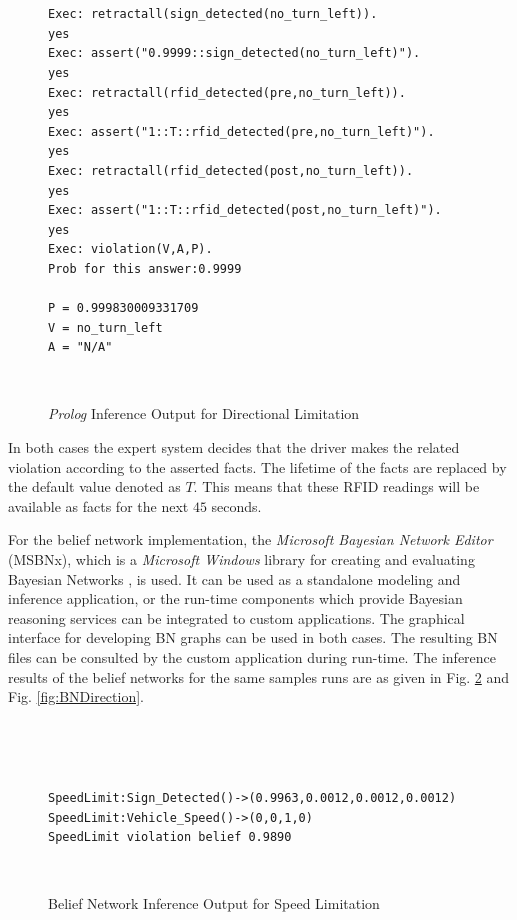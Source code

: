 \documentclass[letterpaper, 10 pt, conference]{ieeeconf}
\newenvironment{mylisting}
{~\par~\begin{list}{}{\setlength{\leftmargin}{1em}}\item\scriptsize\bfseries}
{\end{list}~\par}
\begin{document}
\begin{figure}[thb]
      \centering
\begin{mylisting}

\begin{verbatim}
Exec: retractall(sign_detected(no_turn_left)).
yes
Exec: assert("0.9999::sign_detected(no_turn_left)").
yes
Exec: retractall(rfid_detected(pre,no_turn_left)).
yes
Exec: assert("1::T::rfid_detected(pre,no_turn_left)").
yes
Exec: retractall(rfid_detected(post,no_turn_left)).
yes
Exec: assert("1::T::rfid_detected(post,no_turn_left)").
yes
Exec: violation(V,A,P).
Prob for this answer:0.9999

P = 0.999830009331709
V = no_turn_left
A = "N/A"

\end{verbatim}
\end{mylisting}
      \caption{\textit{Prolog} Inference Output for Directional Limitation}
      \label{fig:InfDriection}
\end{figure}

In both cases the expert system decides that the driver makes the related violation according to the asserted facts. The lifetime of the facts are replaced by the default value denoted as $T$. This means that these RFID readings will be available as facts for the next $45$ seconds.

For the belief network implementation, the \textit{Microsoft Bayesian Network Editor} (MSBNx), which is a \textit{Microsoft Windows} library for creating and evaluating Bayesian Networks \cite{kadie2001msbnx}, is used. It can be used as a standalone modeling and inference application, or the run-time components which provide Bayesian reasoning services can be integrated to custom applications. The graphical interface for developing BN graphs can be used in both cases. The resulting BN files can be consulted by the custom application during run-time. The inference results of the belief networks for the same samples runs are as given in Fig. \ref{fig:BNSpeed} and Fig. \ref{fig:BNDirection}.

\begin{figure}[thb]
      \centering
		   \begin{mylisting}

\begin{verbatim}
SpeedLimit:Sign_Detected()->(0.9963,0.0012,0.0012,0.0012)
SpeedLimit:Vehicle_Speed()->(0,0,1,0)
SpeedLimit violation belief 0.9890
\end{verbatim}
\end{mylisting}
      \caption{Belief Network Inference Output for Speed Limitation}
      \label{fig:BNSpeed}
\end{figure}
\end{document}
